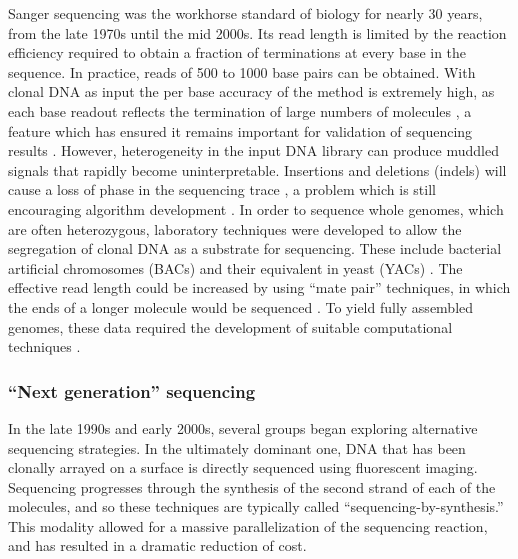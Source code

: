 \documentclass[a4paper,12pt,numbered,oneside]{Classes/PhDThesisPSnPDF}
\begin{document}
Sanger sequencing was the workhorse standard of biology for nearly 30 years, from the late 1970s until the mid 2000s.
Its read length is limited by the reaction efficiency required to obtain a fraction of terminations at every base in the sequence.
In practice, reads of 500 to 1000 base pairs can be obtained.
With clonal DNA as input the per base accuracy of the method is extremely high, as each base readout reflects the termination of large numbers of molecules \cite{castiblanco2013primer}, a feature which has ensured it remains important for validation of sequencing results \cite{sikkema2013targeted}.
However, heterogeneity in the input DNA library can produce muddled signals that rapidly become uninterpretable.
Insertions and deletions (indels) will cause a loss of phase in the sequencing trace \cite{tenney2007tale}, a problem which is still encouraging algorithm development \cite{hill2014poly}.
In order to sequence whole genomes, which are often heterozygous, laboratory techniques were developed to allow the segregation of clonal DNA as a substrate for sequencing.
These include bacterial artificial chromosomes (BACs) and their equivalent in yeast (YACs) \cite{monaco1994yacs}.
The effective read length could be increased by using ``mate pair'' techniques, in which the ends of a longer molecule would be sequenced \cite{schmitt1996framework}.
To yield fully assembled genomes, these data required the development of suitable computational techniques \cite{myers2000whole}.

\subsubsection{``Next generation'' sequencing}

In the late 1990s and early 2000s, several groups began exploring alternative sequencing strategies.
In the ultimately dominant one, DNA that has been clonally arrayed on a surface is directly sequenced using fluorescent imaging.
Sequencing progresses through the synthesis of the second strand of each of the molecules, and so these techniques are typically called ``sequencing-by-synthesis.''
This modality allowed for a massive parallelization of the sequencing reaction, and has resulted in a dramatic reduction of cost.
\end{document}

